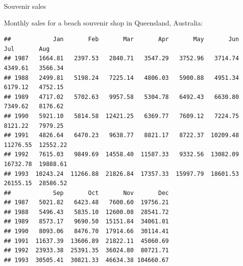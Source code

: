 \begin{frame}[fragile]{Souvenir sales}
  
Monthly sales for a beach souvenir shop in Queensland, Australia:

\begin{knitrout}
\color{fgcolor}\begin{kframe}
\begin{alltt}
\hlkwb{=}\hlstd{(}\hlstd{,}
\hlkwb{=}\hlstd{=}\hlstd{,}\hlstd{=}\hlstd{)}
\end{alltt}
\end{kframe}
\end{knitrout}

{\tiny
\begin{knitrout}
\color{fgcolor}\begin{kframe}
\begin{alltt}
\end{alltt}
\begin{verbatim}
##            Jan       Feb       Mar       Apr       May       Jun       Jul       Aug
## 1987   1664.81   2397.53   2840.71   3547.29   3752.96   3714.74   4349.61   3566.34
## 1988   2499.81   5198.24   7225.14   4806.03   5900.88   4951.34   6179.12   4752.15
## 1989   4717.02   5702.63   9957.58   5304.78   6492.43   6630.80   7349.62   8176.62
## 1990   5921.10   5814.58  12421.25   6369.77   7609.12   7224.75   8121.22   7979.25
## 1991   4826.64   6470.23   9638.77   8821.17   8722.37  10209.48  11276.55  12552.22
## 1992   7615.03   9849.69  14558.40  11587.33   9332.56  13082.09  16732.78  19888.61
## 1993  10243.24  11266.88  21826.84  17357.33  15997.79  18601.53  26155.15  28586.52
##            Sep       Oct       Nov       Dec
## 1987   5021.82   6423.48   7600.60  19756.21
## 1988   5496.43   5835.10  12600.08  28541.72
## 1989   8573.17   9690.50  15151.84  34061.01
## 1990   8093.06   8476.70  17914.66  30114.41
## 1991  11637.39  13606.89  21822.11  45060.69
## 1992  23933.38  25391.35  36024.80  80721.71
## 1993  30505.41  30821.33  46634.38 104660.67
\end{verbatim}
\end{kframe}
\end{knitrout}
}

\end{frame}

